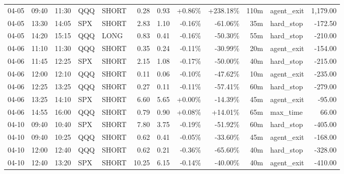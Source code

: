 \documentclass[11pt,a4paper,twoside]{article}
\begin{document}
\begin{center}
\begin{longtable}{>{\color{txtmain}}l l l l l r r r r r >{\color{txtmain}}l r}
04-05 & 09:40 & 11:30 & QQQ & SHORT & 0.28 & 0.93 & \textcolor{wingreen}{+0.86\%} & \textcolor{wingreen}{+238.18\%} & 110m & agent\_exit & \textcolor{wingreen}{1,179.00} \\
04-05 & 13:30 & 14:05 & SPX & SHORT & 2.83 & 1.10 & \textcolor{lossred}{-0.16\%} & \textcolor{lossred}{-61.06\%} & 35m & hard\_stop & \textcolor{lossred}{-172.50} \\
04-05 & 14:20 & 15:15 & QQQ & LONG & 0.83 & 0.41 & \textcolor{lossred}{-0.16\%} & \textcolor{lossred}{-50.30\%} & 55m & hard\_stop & \textcolor{lossred}{-210.00} \\
04-06 & 11:10 & 11:30 & QQQ & SHORT & 0.35 & 0.24 & \textcolor{lossred}{-0.11\%} & \textcolor{lossred}{-30.99\%} & 20m & agent\_exit & \textcolor{lossred}{-154.00} \\
04-06 & 11:45 & 12:25 & SPX & SHORT & 2.15 & 1.08 & \textcolor{lossred}{-0.17\%} & \textcolor{lossred}{-50.00\%} & 40m & hard\_stop & \textcolor{lossred}{-215.00} \\
04-06 & 12:00 & 12:10 & QQQ & SHORT & 0.11 & 0.06 & \textcolor{lossred}{-0.10\%} & \textcolor{lossred}{-47.62\%} & 10m & agent\_exit & \textcolor{lossred}{-235.00} \\
04-06 & 12:25 & 13:25 & QQQ & SHORT & 0.27 & 0.11 & \textcolor{lossred}{-0.11\%} & \textcolor{lossred}{-57.41\%} & 60m & hard\_stop & \textcolor{lossred}{-279.00} \\
04-06 & 13:25 & 14:10 & SPX & SHORT & 6.60 & 5.65 & \textcolor{wingreen}{+0.00\%} & \textcolor{lossred}{-14.39\%} & 45m & agent\_exit & \textcolor{lossred}{-95.00} \\
04-06 & 14:55 & 16:00 & QQQ & SHORT & 0.79 & 0.90 & \textcolor{wingreen}{+0.08\%} & \textcolor{wingreen}{+14.01\%} & 65m & max\_time & \textcolor{wingreen}{66.00} \\
04-10 & 09:40 & 10:40 & SPX & SHORT & 7.80 & 3.75 & \textcolor{lossred}{-0.19\%} & \textcolor{lossred}{-51.92\%} & 60m & hard\_stop & \textcolor{lossred}{-405.00} \\
04-10 & 09:40 & 10:25 & QQQ & SHORT & 0.62 & 0.41 & \textcolor{lossred}{-0.05\%} & \textcolor{lossred}{-33.60\%} & 45m & agent\_exit & \textcolor{lossred}{-168.00} \\
04-10 & 12:00 & 12:40 & QQQ & SHORT & 0.62 & 0.21 & \textcolor{lossred}{-0.36\%} & \textcolor{lossred}{-65.60\%} & 40m & hard\_stop & \textcolor{lossred}{-328.00} \\
04-10 & 12:40 & 13:20 & SPX & SHORT & 10.25 & 6.15 & \textcolor{lossred}{-0.14\%} & \textcolor{lossred}{-40.00\%} & 40m & agent\_exit & \textcolor{lossred}{-410.00} \\

\end{longtable}
\end{center}
\end{document}
